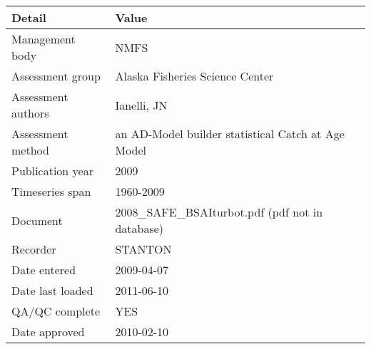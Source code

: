 \begin{table}[htb]
\centering
\begin{tabular}{lp{7cm}}
\toprule
Detail & Value \\
\midrule
Management body    & NMFS                                               \\
Assessment group   & Alaska Fisheries Science Center                    \\
Assessment authors & Ianelli, JN                                        \\
Assessment method  & an AD-Model builder statistical Catch at Age Model \\
Publication year   & 2009                                               \\
Timeseries span    & 1960-2009                                          \\
Document           & 2008\_SAFE\_BSAIturbot.pdf (pdf not in database)   \\
Recorder           & STANTON                                            \\
Date entered       & 2009-04-07                                         \\
Date last loaded   & 2011-06-10                                         \\
QA/QC complete     & YES                                                \\
Date approved      & 2010-02-10                                         \\
\bottomrule
\end{tabular}
\label{tab:assessdet}
\end{table}
